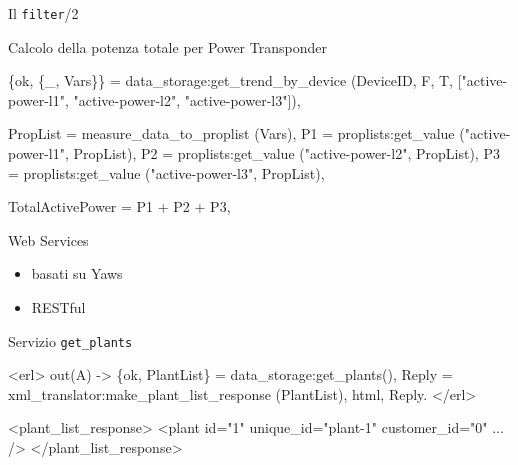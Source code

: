 \documentclass{beamer}
\newcommand{\red}[1]{\textcolor[rgb]{.8,0,0}{#1}}
\newcommand{\blue}[1]{\textcolor[rgb]{0,0,.7}{#1}}
\newcommand{\navy}[1]{\textcolor[rgb]{0,0,.5}{#1}}
\newcommand{\purple}[1]{\textcolor[rgb]{.7,0,.8}{#1}}
\begin{document}
%
\begin{frame}[fragile]{Il \texttt{filter}/2}
  \begin{exampleblock}{Calcolo della potenza totale per Power Transponder}
    \begin{semiverbatim}
      \begin{small}
\{ok, \{_, \blue{Vars}\}\} = 
  \red{data_storage:get_trend_by_device} (\blue{DeviceID}, F, T, 
                                   ["active-power-l1",
                                    "active-power-l2",
                                    "active-power-l3"]),
	      
\blue{PropList} = \red{measure_data_to_proplist} (\blue{Vars}),
\blue{P1} = \red{proplists:get_value} ("active-power-l1", \blue{PropList}),
\blue{P2} = \red{proplists:get_value} ("active-power-l2", \blue{PropList}),
\blue{P3} = \red{proplists:get_value} ("active-power-l3", \blue{PropList}),
	      
\blue{TotalActivePower} = \blue{P1} + \blue{P2} + \blue{P3}, 
\end{small}
    \end{semiverbatim}
  \end{exampleblock}
\end{frame}


\begin{frame}[fragile]{Web Services}
  \begin{itemize}
  \item basati su \red{Yaws}
  \item \red{RESTful}
  \end{itemize}
%
  \begin{exampleblock}{Servizio \texttt{get\_plants}}
    \begin{semiverbatim}
      \begin{small}
<erl>
out(A) ->
 \{ok, \blue{PlantList}\} = \red{data_storage:get_plants}(),
  Reply =
    \red{xml_translator:make_plant_list_response} (\blue{PlantList}),
  {html, \blue{Reply}}.
</erl>

<\purple{plant_list_response}>
  <\purple{plant} \navy{id}="1" \navy{unique_id}="plant-1" \navy{customer_id}="0" ... />
</\purple{plant_list_response}>
      \end{small}
    \end{semiverbatim}
  \end{exampleblock}
\end{frame}
\end{document}
